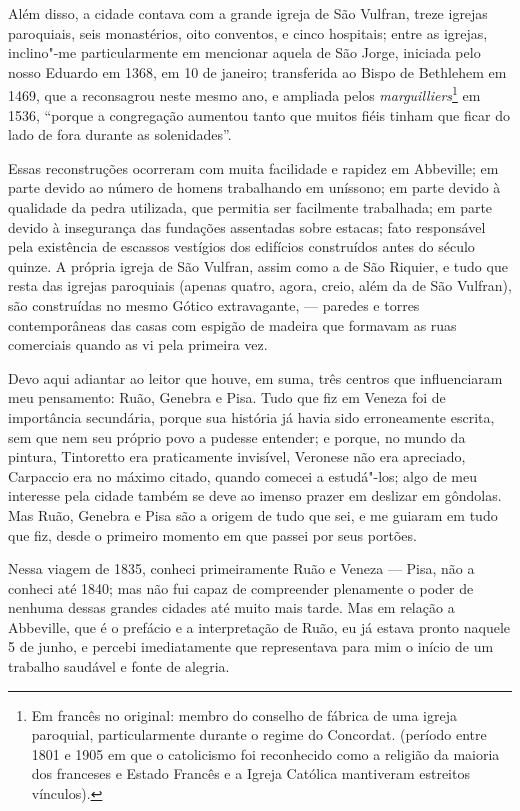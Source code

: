 Além disso, a cidade contava com a grande igreja de São Vulfran, treze
igrejas paroquiais, seis monastérios, oito conventos, e cinco hospitais;
entre as igrejas, inclino"-me particularmente em mencionar aquela de São
Jorge, iniciada pelo nosso Eduardo em 1368, em 10 de janeiro;
transferida ao Bispo de Bethlehem em 1469, que a reconsagrou neste mesmo
ano, e ampliada pelos \textit{marguilliers}\footnote{Em francês no
  original: membro do conselho de fábrica de uma igreja paroquial,
  particularmente durante o regime do Concordat. (período entre 1801 e
  1905 em que o catolicismo foi reconhecido como a religião da maioria
  dos franceses e Estado Francês e a Igreja Católica mantiveram
  estreitos vínculos).} em 1536, ``porque a congregação
aumentou tanto que muitos fiéis tinham que ficar do lado de fora durante
as solenidades''.

Essas reconstruções ocorreram com muita facilidade e rapidez em
Abbeville; em parte devido ao número de homens trabalhando em uníssono;
em parte devido à qualidade da pedra utilizada, que permitia ser
facilmente trabalhada; em parte devido à insegurança das fundações
assentadas sobre estacas; fato responsável pela existência de escassos
vestígios dos edifícios construídos antes do século quinze. A própria
igreja de São Vulfran, assim como a de São Riquier, e tudo que resta das
igrejas paroquiais (apenas quatro, agora, creio, além da de São
Vulfran), são construídas no mesmo Gótico extravagante, --- paredes e
torres contemporâneas das casas com espigão de madeira que formavam as
ruas comerciais quando as vi pela primeira vez.

Devo aqui adiantar ao leitor que houve, em suma, três centros que
influenciaram meu pensamento: Ruão, Genebra e Pisa. Tudo que fiz em
Veneza foi de importância secundária, porque sua história já havia sido
erroneamente escrita, sem que nem seu próprio povo a pudesse entender; e
porque, no mundo da pintura, Tintoretto era praticamente invisível,
Veronese não era apreciado, Carpaccio era no máximo citado, quando
comecei a estudá"-los; algo de meu interesse pela cidade também se deve
ao imenso prazer em deslizar em gôndolas. Mas Ruão, Genebra e Pisa são a
origem de tudo que sei, e me guiaram em tudo que fiz, desde o primeiro
momento em que passei por seus portões.

Nessa viagem de 1835, conheci primeiramente Ruão e Veneza --- Pisa, não a
conheci até 1840; mas não fui capaz de compreender plenamente o poder de
nenhuma dessas grandes cidades até muito mais tarde. Mas em relação a
Abbeville, que é o prefácio e a interpretação de Ruão, eu já estava
pronto naquele 5 de junho, e percebi imediatamente que representava para
mim o início de um trabalho saudável e fonte de alegria.


